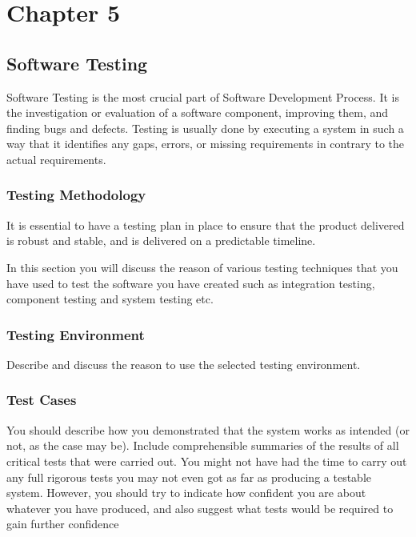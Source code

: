 


\setcounter{chapter}{5}
\setcounter{figure}{0}
\setcounter{table}{0}
\chapter*{Chapter 5}
\section{Software Testing}

Software Testing is the most crucial part of Software Development Process. It is the investigation or evaluation of a software component, improving them, and finding bugs and defects. Testing is usually done by executing a system in such a way that it identifies any gaps, errors, or missing requirements in contrary to the actual requirements.

\subsection{Testing Methodology}
It is essential to have a testing plan in place to ensure that the product delivered is robust and stable, and is delivered on a predictable timeline.


In this section you will discuss the reason of various testing techniques that you have used to test the software you have created such as integration testing, component testing and system testing etc.

\subsection{Testing Environment}
Describe and discuss the reason to use the selected testing environment.

\subsection{Test Cases}
You should describe how you demonstrated that the system works as intended (or not, as the case may be). Include comprehensible summaries of the results of all critical tests that were carried out. You might not have had the time to carry out any full rigorous tests you may not even got as far as producing a testable system. However, you should try to indicate how confident you are about whatever you have produced, and also suggest what tests would be required to gain further confidence

